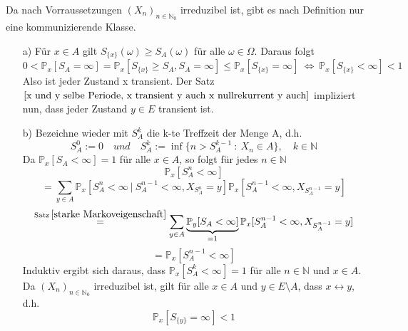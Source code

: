 Da nach Vorraussetzungen $(X_{n})_{n \in \mathbb{N}_{0}}$ irreduzibel ist, gibt es nach Definition nur eine kommunizierende Klasse.
\begin{itemize}
\item[a)] Für $x \in A$ gilt $S_{\lbrace x \rbrace}(\omega) \geq S_{A}(\omega)$ für alle $\omega \in \Omega$. Daraus folgt
\begin{equation*}
0<\mathbb{P}_{x}[S_{A}=\infty] = \mathbb{P}_{x}[S_{\lbrace x \rbrace} \geq S_{A}, S_{A} = \infty] \leq \mathbb{P}_{x}[S_{\lbrace x \rbrace} = \infty] \: \Leftrightarrow \: \mathbb{P}_{x}[S_{\lbrace x \rbrace} < \infty] < 1
\end{equation*}
Also ist jeder Zustand x transient. Der Satz $\ref{x und y selbe Periode, x transient y auch x nullrekurrent y auch}$ impliziert nun, dass jeder Zustand $y \in E$ transient ist. 
\item[b)] Bezeichne wieder mit $S_{A}^{k}$ die k-te Treffzeit der Menge A, d.h.
\begin{equation*}
S_{A}^{0} := 0 \quad und \quad S_{A}^{k} := \inf \lbrace n> S_{A}^{k-1} \: : \: X_{n} \in A \rbrace, \quad k \in \mathbb{N}
\end{equation*}
Da $\mathbb{P}_{x}[S_{A} < \infty] = 1$ für alle $x \in A$, so folgt für jedes $n \in \mathbb{N}$
\begin{equation*}
\mathbb{P}_{x} [S_{A}^{n} < \infty] 
\end{equation*}
\begin{equation*}
= \sum_{y \in A} \mathbb{P}_{x}[S_{A}^{n} < \infty \: | \: S_{A}^{n-1} < \infty, X_{S_{A}^{n}}=y]\mathbb{P}_{x} [S_{A}^{n-1} < \infty, X_{S_{A}^{n-1}} = y] 
\end{equation*}
\begin{equation*}
\stackrel{\mathrm{Satz} \: \ref{starke Markoveigenschaft}}{=} \sum_{y \in A} \underbrace{\mathbb{P}_{y}[S_{A} < \infty]}_{= 1} \mathbb{P}_{x} [S_{A}^{n-1} < \infty, X_{S_{A}^{n-1}} = y]
\end{equation*}
\begin{equation*}
= \mathbb{P}_{x}[S_{A}^{n-1} < \infty]
\end{equation*}
Induktiv ergibt sich daraus, dass $\mathbb{P}_{x}[S_{A}^{k} < \infty] = 1$ für alle $n \in \mathbb{N}$ und $x \in A$.
\\
Da $(X_{n})_{n \in \mathbb{N}_{0}}$ irreduzibel ist, gilt für alle $x \in A$ und $y \in E \setminus A$, dass $x \leftrightarrow y$, d.h.
\begin{equation*}
\mathbb{P}_{x}[S_{\lbrace y \rbrace} = \infty] < 1

\end{equation*}
\end{itemize}
